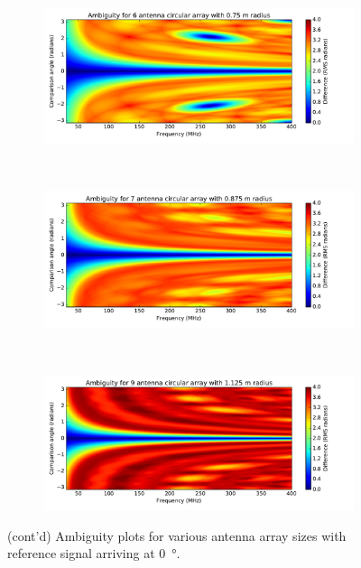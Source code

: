 \begin{figure}
  \ContinuedFloat
  \centering
  \begin{subfigure}{\textwidth}
    \centering
    \includegraphics[width=\textwidth, clip=true, trim = 10 15 53 0]{ambiguity06}
  \end{subfigure}\\[1em]
  \begin{subfigure}{\textwidth}
    \centering
    \includegraphics[width=\textwidth, clip=true, trim = 10 15 53 0]{ambiguity07}
  \end{subfigure}\\[1em]
  \begin{subfigure}{\textwidth}
    \centering
    \includegraphics[width=\textwidth, clip=true, trim = 10 15 53 0]{ambiguity09}
  \end{subfigure}
  \caption{(cont'd) Ambiguity plots for various antenna array sizes with reference signal arriving at \SI{0}{\degree}.}
\end{figure}

